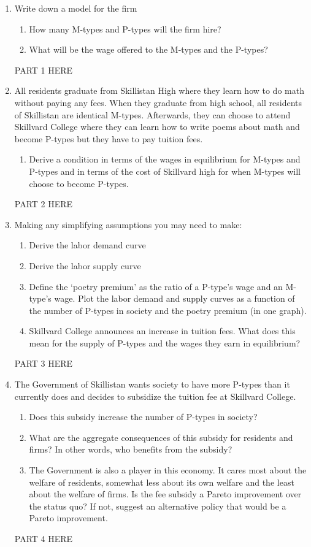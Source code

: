 \documentclass[12pt]{article}
\begin{document}
\begin{enumerate} 
\item{Write down a model for the firm}
\begin{enumerate}
\item{How many M-types and P-types will the firm hire?}
\item{What will be the wage offered to the M-types and the P-types?}
\end{enumerate}

PART 1 HERE


\item{All residents graduate from Skillistan High where they learn how to do math without
paying any fees. When they graduate from high school, all residents of Skillistan are
identical M-types. Afterwards, they can choose to attend Skillvard College where
they can learn how to write poems about math and become P-types but they have
to pay tuition fees.}
\begin{enumerate}
\item{Derive a condition in terms of the wages in equilibrium for M-types and P-types
and in terms of the cost of Skillvard high for when M-types will choose to become
P-types.}
\end{enumerate}

PART 2 HERE

\item{Making any simplifying assumptions you may need to make:}
\begin{enumerate}
\item{Derive the labor demand curve}
\item{Derive the labor supply curve}
\item{Define the `poetry premium’ as the ratio of a P-type’s wage and an M-type’s
wage. Plot the labor demand and supply curves as a function of the number of
P-types in society and the poetry premium (in one graph).}
\item{Skillvard College announces an increase in tuition fees. What does this mean
for the supply of P-types and the wages they earn in equilibrium?}
\end{enumerate}

PART 3 HERE

\item{The Government of Skillistan wants society to have more P-types than it currently
does and decides to subsidize the tuition fee at Skillvard College.}
\begin{enumerate}
\item{Does this subsidy increase the number of P-types in society?}
\item{What are the aggregate consequences of this subsidy for residents and firms? In
other words, who benefits from the subsidy?}
\item{The Government is also a player in this economy. It cares most about the welfare
of residents, somewhat less about its own welfare and the least about the
welfare of firms. Is the fee subsidy a Pareto improvement over the status quo?
If not, suggest an alternative policy that would be a Pareto improvement.}
\end{enumerate}

PART 4 HERE

\end{enumerate}
\end{document}
